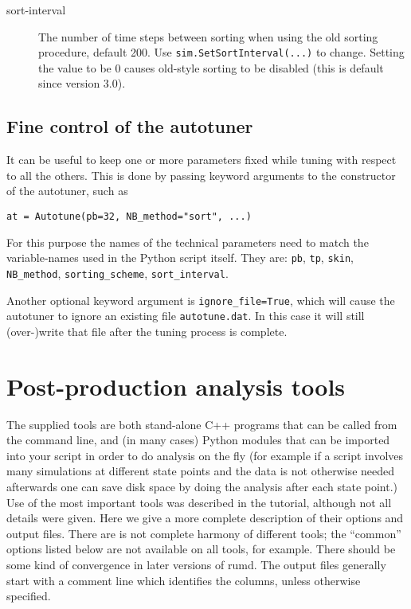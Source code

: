 \documentclass[a4paper]{article}
\begin{document}
\begin{description}
\item[sort-interval] The number of time steps between sorting when using the old sorting procedure, default 200. Use \verb|sim.SetSortInterval(...)| to change. Setting the value to be 0 causes old-style sorting to be disabled (this is default since version 3.0).
\end{description}


\subsection{Fine control of the autotuner}

It can be useful to keep one or more parameters fixed while tuning with respect
to all the others. This is done by passing keyword arguments to the constructor
of the autotuner, such as

\begin{verbatim}
at = Autotune(pb=32, NB_method="sort", ...)
\end{verbatim}
For this purpose the names of the technical parameters need to match the 
variable-names used in the Python script itself. They are: \verb|pb|, 
\verb|tp|, \verb|skin|, \verb|NB_method|, \verb|sorting_scheme|, \verb|sort_interval|. 

Another optional keyword argument is \verb|ignore_file=True|, which will cause 
the autotuner to ignore an existing file \verb|autotune.dat|. In this case
it will still (over-)write that file after the tuning process is complete.


\section{Post-production analysis tools}



The supplied tools are both stand-alone C++ programs that can be called from
the command line, and (in many cases) 
Python modules that can be imported into your script
in order to do analysis on the fly (for example if a script involves many 
simulations at different state points and the data is not otherwise needed
afterwards one can save disk space by doing the analysis after each state
point.)
Use of the most important tools was described in the tutorial, although not
all details were given. Here we give a 
more complete description of their options and output files. There are is not
complete harmony of different tools; the ``common'' options listed below are not
available on all tools, for example. There should be some kind of convergence
in later versions of rumd. The output files generally start with a comment line
which identifies the columns, unless otherwise specified.
\end{document}
